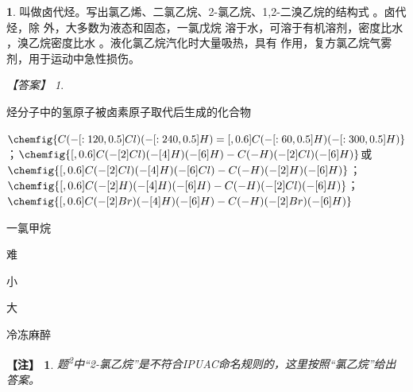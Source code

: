 \documentclass[UTF8, 10pt, a4paper, oneside]{ctexart}
\newcommand{\blank}{ \underbar{\quad$\blacktriangle$\quad} }%
\theoremstyle{definition}
\newtheorem{exercise}{}
\theoremstyle{remark}
\newtheorem*{answer}{【答案】}
\theoremstyle{plain}
\newtheorem*{note}{【注】}  %
\begin{document}
\begin{exercise}
    \blank 叫做卤代烃。写出氯乙烯、二氯乙烷、2-氯乙烷、1,2-二溴乙烷的结构式\blank 。卤代烃，除\blank 外，大多数为液态和固态，一氯戊烷\blank 溶于水，可溶于有机溶剂，密度比水\blank ，溴乙烷密度比水\blank 。液化氯乙烷汽化时大量吸热，具有\blank 作用，复方氯乙烷气雾剂，用于运动中急性损伤。

    \begin{answer}
        \begin{inparaenum}
            \item[\setcounter{enumi}{1}\textsuperscript{\arabic{enumi}}] 烃分子中的氢原子被卤素原子取代后生成的化合物
            \item $\chemfig{C(-[:120,0.5]Cl)(-[:240,0.5]H)=[,0.6]C(-[:60,0.5]H)(-[:300,0.5]H)}$；$\chemfig{[,0.6]C(-[2]Cl)(-[4]H)(-[6]H)-C(-H)(-[2]Cl)(-[6]H)}$或$\chemfig{[,0.6]C(-[2]Cl)(-[4]H)(-[6]Cl)-C(-H)(-[2]H)(-[6]H)}$；$\chemfig{[,0.6]C(-[2]H)(-[4]H)(-[6]H)-C(-H)(-[2]Cl)(-[6]H)}$；$\chemfig{[,0.6]C(-[2]Br)(-[4]H)(-[6]H)-C(-H)(-[2]Br)(-[6]H)}$
            \item 一氯甲烷
            \item 难
            \item 小
            \item 大
            \item 冷冻麻醉
        \end{inparaenum}
    \end{answer}
    \begin{note}
        题\textsuperscript{2}中“2-氯乙烷”是不符合IPUAC命名规则的，这里按照“氯乙烷”给出答案。
    \end{note}
\end{exercise}
\end{document}
